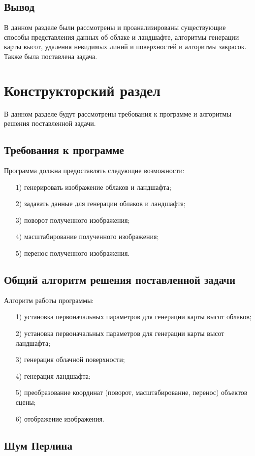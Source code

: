 \documentclass[14pt, a4paper]{extarticle}
\begin{document}
\subsection{Вывод}
В данном разделе были рассмотрены и проанализированы существующие способы представления данных об облаке и ландшафте, алгоритмы генерации карты высот, удаления невидимых линий и поверхностей и алгоритмы закрасок. Также была поставлена задача.

\clearpage
\section{Конструкторский раздел}
В данном разделе будут рассмотрены требования к программе и алгоритмы решения поставленной задачи. 
\subsection{Требования к программе}
Программа должна предоставлять следующие возможности:
\begin{enumerate}
	\item[1)] генерировать изображение облаков и ландшафта;
	\item[2)] задавать данные для генерации облаков и ландшафта;
	\item[3)] поворот полученного изображения;
	\item[4)] масштабирование полученного изображения;
	\item[5)] перенос полученного изображения.
\end{enumerate}
\subsection{Общий алгоритм решения поставленной задачи}
Алгоритм работы программы:
\begin{enumerate}
	\item[1)] установка первоначальных параметров для генерации карты высот облаков;
	\item[2)] установка первоначальных параметров для генерации карты высот ландшафта;
	\item[3)] генерация облачной поверхности;
	\item[4)] генерация ландшафта;
	\item[5)] преобразование координат (поворот, масштабирование, перенос) объектов сцены;
	\item[6)] отображение изображения.
\end{enumerate}
\subsection{Шум Перлина}
\end{document}
